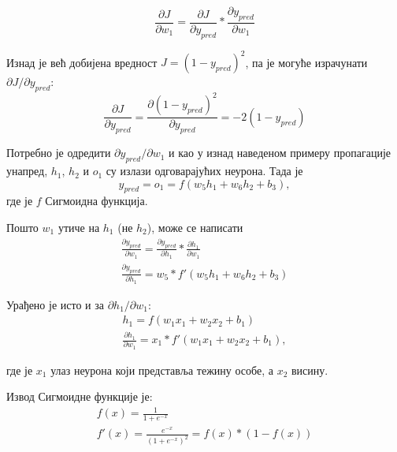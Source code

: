 \documentclass[12pt, а4paper]{article}
\begin{document}
\begin{equation}
\frac{\partial J}{\partial w_1} = \frac{\partial J}{\partial y_{pred}} * \frac{\partial y_{pred}}{\partial w_1}
\end{equation}

Изнад је већ добијена вредност $J = (1 - y_{pred})^2$, па је могуће израчунати
$\partial J / \partial y_{pred}$:
\begin{equation}
\frac{\partial J}{\partial y_{pred}} = \frac{\partial (1 - y_{pred})^2}{\partial y_{pred}} = -2(1 - y_{pred})
\end{equation}

Потребно је одредити $\partial y_{pred} / \partial w_1$ и као у изнад
наведеном примеру пропагације унапред, $h_1$, $h_2$ и $o_1$ су излази
одговарајућих неурона. Тада је
\begin{equation}
y_{pred} = o_1 = f(w_5 h_1 + w_6 h_2 + b_3),
\end{equation}
где је $f$ Сигмоидна функција.

Пошто $w_1$ утиче на $h_1$ (не $h_2$), може се написати
\begin{equation}
\begin{gathered}
\frac{\partial y_{pred}}{\partial w_1} = \frac{\partial y_{pred}}{\partial h_1} * \frac{\partial h_1}{\partial w_1} \\
\frac{\partial y_{pred}}{\partial h_1} = w_5 * f'(w_5 h_1 + w_6 h_2 + b_3)
\end{gathered}
\end{equation}

Урађено је исто и за $\partial h_1 / \partial w_1$:
\begin{equation}
\begin{gathered}
h_1 = f(w_1 x_1 + w_2 x_2 + b_1) \\
\frac{\partial h_1}{\partial w_1} = x_1 * f'(w_1 x_1 + w_2 x_2 + b_1),
\end{gathered}
\end{equation}

где је $x_1$ улаз неурона који представља тежину особе, а $x_2$ висину.

Извод Сигмоидне функције је:
\begin{equation}
\begin{gathered}
f(x) = \frac{1}{1 + e^{-x}} \\
f'(x) = \frac{e^{-x}}{(1 + e^{-x})^2} = f(x) * (1 - f(x))
\end{gathered}
\label{eq:izvod}
\end{equation}
\end{document}
